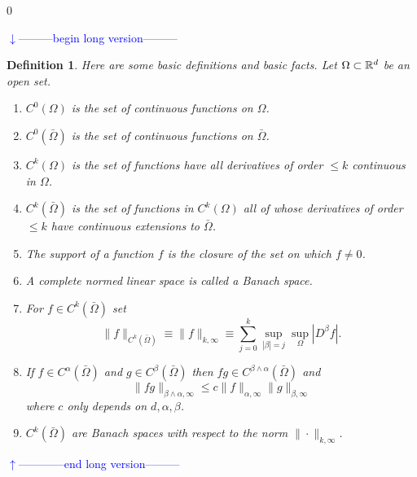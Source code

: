 \documentclass[noinfoline]{imsart}
\newtheorem{definition}{Definition}
\def\Ver{1}
\def\LongVer{0}
\begin{document}
\if\Ver\LongVer{
{\flushleft\textcolor{blue}{$\downarrow$---------begin long version---------}}\newline

\begin{definition}
Here are some basic definitions and basic facts. Let $\Omega \subset \Bbb R^d$ be an open set.
\begin{enumerate}
\item $C^0(\Omega)$ is the set of continuous functions on $\Omega$.
\item $C^0(\bar\Omega)$ is the set of continuous functions on $\bar\Omega$.
\item $C^k(\Omega)$ is the set of functions have all derivatives of order $\leq k$ continuous in $\Omega$.
\item $C^k(\bar\Omega)$ is the set of functions in $C^k(\Omega)$ all of whose derivatives of order $\leq k$ have continuous extensions to $\bar\Omega$.
\item The {\em support } of a function $f$ is the closure of the set on which $f\neq 0$.
\item A complete normed linear space is called a {\em Banach space}.
\item For $f\in C^k(\bar\Omega)$ set
\[ \| f \|_{C^k(\bar \Omega)}\equiv \| f \|_{k,\infty}\equiv \sum_{j=0}^k \sup_{|\beta|=j}\sup_{\Omega} |D^\beta f|.\]
\item If $f\in C^\alpha(\bar\Omega)$ and $g\in C^\beta(\bar\Omega)$ then $fg \in C^{\beta\wedge \alpha}(\bar\Omega)$ and
\[ \|fg  \|_{\beta\wedge \alpha,\infty}\leq c \|f  \|_{ \alpha,\infty}\|g  \|_{\beta,\infty}  \]
where $c$ only depends on $d,\alpha, \beta$.
\item  $C^k(\bar\Omega)$ are Banach spaces with respect to the norm $\| \cdot \|_{k,\infty}$.
\end{enumerate}
\end{definition}

{\flushleft\textcolor{blue}{$\uparrow$------------end long version---------}}\newline
} \fi
\end{document}

